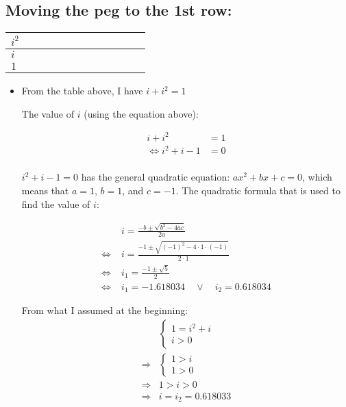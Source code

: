 \documentclass[12pt]{article}
\begin{document}
\vspace{1cm}

\subsection*{Moving the peg to the 1st row:}
\begin{center}
\begin{tabular}{|l|c|c|c|c|c|c|c|c|c|c|r|}
    \hline
    $i^2$ \\
    \hline
    $i$ \\
    \hline
    $1$ \\
    \hline
\end{tabular}
\end{center}

\begin{itemize}
    \item From the table above, I have $i+i^2=1$
    
    The value of $i$ (using the equation above): \par
    
    \begin{align*}
        i+i^2&=1\\
        \Longleftrightarrow
        i^2+i-1&=0\\
    \end{align*}

    \noindent $i^2+i-1=0$ has the general quadratic equation: $ax^2+bx+c=0$, which means that $a=1$, $b=1$, and $c=-1$. The quadratic formula that is used to find the value of $i$:

    \begin{align*}
        & i = \frac{-b\pm \sqrt{b^2-4ac}}{2a} \\
        \Longleftrightarrow\;
        & i = \frac{-1\pm \sqrt{\left(-1\right)^2 -4\cdot 1 \cdot (-1)}}{2\cdot 1}\\
        \Longleftrightarrow\;
        & i_1 = \frac{-1\pm\sqrt{5}}{2}\\
        \Longleftrightarrow\;
        & i_1 = -1.618034
        \quad \lor\quad i_2 = 0.618034
    \end{align*}


    \noindent From what I assumed at the beginning:
    \begin{align*}
        &
        \begin{cases}
            1=i^2+i \\
            i>0
        \end{cases}\\
        \Longrightarrow &
        \begin{cases}
            1>i\\
            1>0
        \end{cases}\\
        \Longrightarrow & 1>i>0\\
        \Longrightarrow & i= i_2=0.618033
    \end{align*}


\end{itemize}
\end{document}
